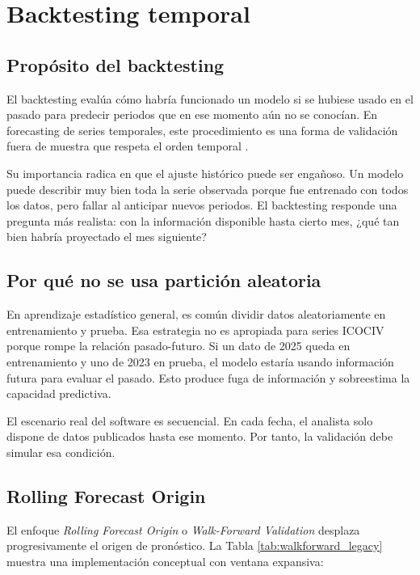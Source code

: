 \section{Backtesting temporal}

\subsection{Propósito del backtesting}

El backtesting evalúa cómo habría funcionado un modelo si se hubiese usado en el pasado para predecir periodos que en ese momento aún no se conocían. En forecasting de series temporales, este procedimiento es una forma de validación fuera de muestra que respeta el orden temporal \parencite{hyndman_tscv_2021,skforecast_backtesting_2026}.

Su importancia radica en que el ajuste histórico puede ser engañoso. Un modelo puede describir muy bien toda la serie observada porque fue entrenado con todos los datos, pero fallar al anticipar nuevos periodos. El backtesting responde una pregunta más realista: con la información disponible hasta cierto mes, ¿qué tan bien habría proyectado el mes siguiente?

\subsection{Por qué no se usa partición aleatoria}

En aprendizaje estadístico general, es común dividir datos aleatoriamente en entrenamiento y prueba. Esa estrategia no es apropiada para series ICOCIV porque rompe la relación pasado-futuro. Si un dato de 2025 queda en entrenamiento y uno de 2023 en prueba, el modelo estaría usando información futura para evaluar el pasado. Esto produce fuga de información y sobreestima la capacidad predictiva.

El escenario real del software es secuencial. En cada fecha, el analista solo dispone de datos publicados hasta ese momento. Por tanto, la validación debe simular esa condición.

\subsection{Rolling Forecast Origin}

El enfoque \textit{Rolling Forecast Origin} o \textit{Walk-Forward Validation} desplaza progresivamente el origen de pronóstico. La Tabla \ref{tab:walkforward_legacy} muestra una implementación conceptual con ventana expansiva:

